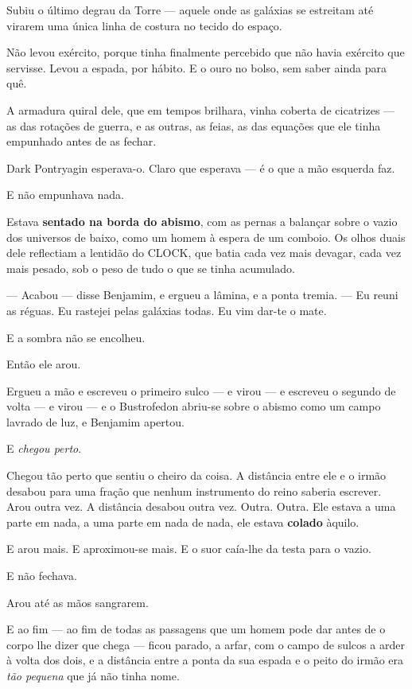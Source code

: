 \documentclass[livro.tex]{subfiles}
\begin{document}
Subiu o último degrau da Torre --- aquele onde as galáxias se estreitam até virarem uma única linha de costura no
tecido do espaço.

Não levou exército, porque tinha finalmente percebido que não havia exército que servisse. Levou a espada, por
hábito. E o ouro no bolso, sem saber ainda para quê.

A armadura quiral dele, que em tempos brilhara, vinha coberta de cicatrizes --- as das rotações de guerra, e as
outras, as feias, as das equações que ele tinha empunhado antes de as fechar.

\medskip

Dark Pontryagin esperava-o. Claro que esperava --- é o que a mão esquerda faz.

E não empunhava nada.

Estava \textbf{sentado na borda do abismo}, com as pernas a balançar sobre o vazio dos universos de baixo, como um
homem à espera de um comboio. Os olhos duais dele reflectiam a lentidão do CLOCK, que batia cada vez mais devagar,
cada vez mais pesado, sob o peso de tudo o que se tinha acumulado.

--- Acabou --- disse Benjamim, e ergueu a lâmina, e a ponta tremia. --- Eu reuni as réguas. Eu rastejei pelas
galáxias todas. Eu vim dar-te o mate.

E a sombra não se encolheu.

\medskip

Então ele arou.

Ergueu a mão e escreveu o primeiro sulco --- e virou --- e escreveu o segundo de volta --- e virou --- e o
Bustrofedon abriu-se sobre o abismo como um campo lavrado de luz, e Benjamim apertou.

E \emph{chegou perto}.

Chegou tão perto que sentiu o cheiro da coisa. A distância entre ele e o irmão desabou para uma fração que nenhum
instrumento do reino saberia escrever. Arou outra vez. A distância desabou outra vez. Outra. Outra. Ele estava a
uma parte em nada, a uma parte em nada de nada, ele estava \textbf{colado} àquilo.

E arou mais. E aproximou-se mais. E o suor caía-lhe da testa para o vazio.

E não fechava.

\medskip

Arou até as mãos sangrarem.

E ao fim --- ao fim de todas as passagens que um homem pode dar antes de o corpo lhe dizer que chega --- ficou
parado, a arfar, com o campo de sulcos a arder à volta dos dois, e a distância entre a ponta da sua espada e o
peito do irmão era \emph{tão pequena} que já não tinha nome.
\end{document}
